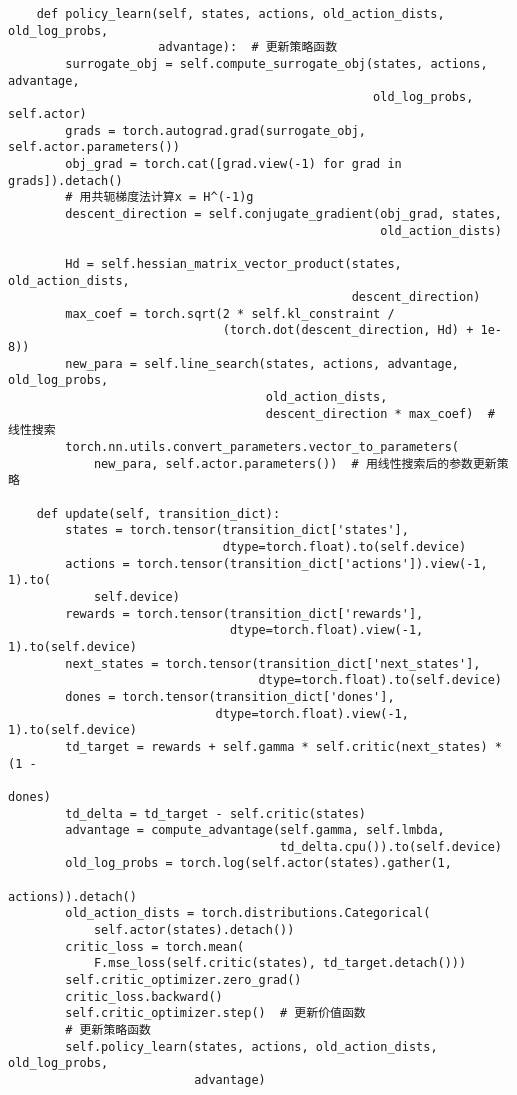 \begin{lstlisting}
    def policy_learn(self, states, actions, old_action_dists, old_log_probs,
                     advantage):  # 更新策略函数
        surrogate_obj = self.compute_surrogate_obj(states, actions, advantage,
                                                   old_log_probs, self.actor)
        grads = torch.autograd.grad(surrogate_obj, self.actor.parameters())
        obj_grad = torch.cat([grad.view(-1) for grad in grads]).detach()
        # 用共轭梯度法计算x = H^(-1)g
        descent_direction = self.conjugate_gradient(obj_grad, states,
                                                    old_action_dists)

        Hd = self.hessian_matrix_vector_product(states, old_action_dists,
                                                descent_direction)
        max_coef = torch.sqrt(2 * self.kl_constraint /
                              (torch.dot(descent_direction, Hd) + 1e-8))
        new_para = self.line_search(states, actions, advantage, old_log_probs,
                                    old_action_dists,
                                    descent_direction * max_coef)  # 线性搜索
        torch.nn.utils.convert_parameters.vector_to_parameters(
            new_para, self.actor.parameters())  # 用线性搜索后的参数更新策略

    def update(self, transition_dict):
        states = torch.tensor(transition_dict['states'],
                              dtype=torch.float).to(self.device)
        actions = torch.tensor(transition_dict['actions']).view(-1, 1).to(
            self.device)
        rewards = torch.tensor(transition_dict['rewards'],
                               dtype=torch.float).view(-1, 1).to(self.device)
        next_states = torch.tensor(transition_dict['next_states'],
                                   dtype=torch.float).to(self.device)
        dones = torch.tensor(transition_dict['dones'],
                             dtype=torch.float).view(-1, 1).to(self.device)
        td_target = rewards + self.gamma * self.critic(next_states) * (1 -
                                                                       dones)
        td_delta = td_target - self.critic(states)
        advantage = compute_advantage(self.gamma, self.lmbda,
                                      td_delta.cpu()).to(self.device)
        old_log_probs = torch.log(self.actor(states).gather(1,
                                                            actions)).detach()
        old_action_dists = torch.distributions.Categorical(
            self.actor(states).detach())
        critic_loss = torch.mean(
            F.mse_loss(self.critic(states), td_target.detach()))
        self.critic_optimizer.zero_grad()
        critic_loss.backward()
        self.critic_optimizer.step()  # 更新价值函数
        # 更新策略函数
        self.policy_learn(states, actions, old_action_dists, old_log_probs,
                          advantage)


\end{lstlisting}
